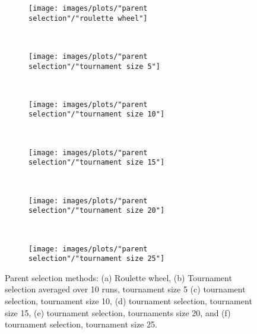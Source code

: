 \begin{figure}[h!]
    \centering
    \begin{subfigure}[b]{0.31\textwidth}
        \texttt{[image: images/plots/"parent selection"/"roulette wheel"]}
        \caption{}
        \hfill
        \label{plot:roulette wheel}
    \end{subfigure}
    ~
    \begin{subfigure}[b]{0.31\textwidth}
        \texttt{[image: images/plots/"parent selection"/"tournament size 5"]}
        \caption{}
        \hfill
        \label{plot:tournament size 5}
    \end{subfigure}
    ~
       \begin{subfigure}[b]{0.31\textwidth}
        \texttt{[image: images/plots/"parent selection"/"tournament size 10"]}
        \caption{}
        \hfill
        \label{plot:tournament size 10}
    \end{subfigure}
    ~
       \begin{subfigure}[b]{0.31\textwidth}
        \texttt{[image: images/plots/"parent selection"/"tournament size 15"]}
        \caption{}
        \hfill
        \label{plot:tournament size 15}
    \end{subfigure}
    ~
       \begin{subfigure}[b]{0.31\textwidth}
        \texttt{[image: images/plots/"parent selection"/"tournament size 20"]}
        \caption{}
        \hfill
        \label{plot:tournament size 20}
    \end{subfigure}
    ~
    \begin{subfigure}[b]{0.31\textwidth}
        \texttt{[image: images/plots/"parent selection"/"tournament size 25"]}
        \caption{}
        \hfill
        \label{plot:tournament size 25}
    \end{subfigure}
    \caption{Parent selection methods: (a) Roulette wheel, (b) Tournament selection averaged over 10 runs, tournament size 5 (c) tournament selection, tournament size 10, (d) tournament selection, tournament size 15, (e) tournament selection, tournaments size 20, and (f) tournament selection, tournament size 25.}
    \label{plot:parent selection}
\end{figure}


